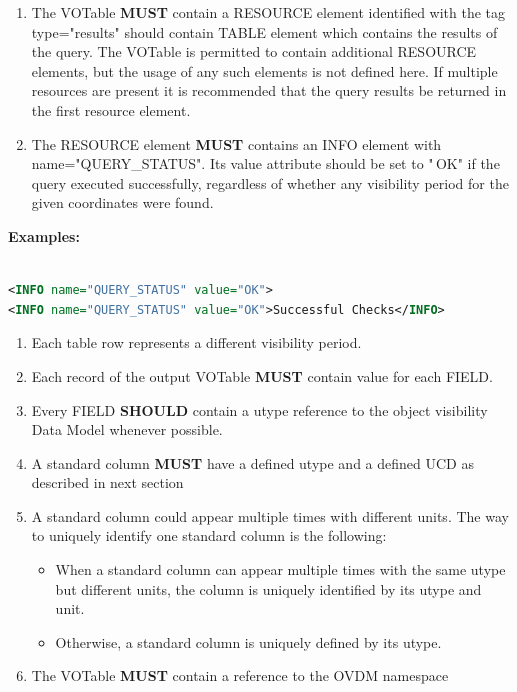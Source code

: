 \documentclass[11pt,a4paper]{ivoatex/ivoa}
\begin{document}
\begin{enumerate}
\item The VOTable \textbf{MUST} contain a RESOURCE element identified
with the tag type="results" should contain TABLE element which contains
the results of the query. The VOTable is permitted to contain additional
RESOURCE elements, but the usage of any such elements is not defined
here. If multiple resources are present it is recommended that the query
results be returned in the first resource element.
\item The RESOURCE element \textbf{MUST} contains an INFO element with
name="QUERY\_STATUS". Its value attribute should be set to "\,OK" if the
query executed successfully, regardless of whether any visibility period
for the given coordinates were found.
\setcounter{numberedCntBI}{\theenumi}
\end{enumerate}

\textbf{Examples: }
\begin{lstlisting}[language=XML]

<INFO name="QUERY_STATUS" value="OK">
<INFO name="QUERY_STATUS" value="OK">Successful Checks</INFO>
\end{lstlisting}

\begin{enumerate}
\setcounter{enumi}{\thenumberedCntBI}
\item Each table row represents a different visibility period.
\item Each record of the output VOTable \textbf{MUST} contain value
for each FIELD.
\item Every FIELD \textbf{SHOULD} contain a utype reference to the
object visibility Data Model whenever possible.
\item A standard column \textbf{MUST} have a defined utype and a
defined UCD as described in next section
\item A standard column could appear multiple times with different
units. The way to uniquely identify one standard column is the
following:
\begin{itemize}
\item When a standard column can appear multiple times with the same
utype but different units, the column is uniquely identified by its
utype and unit.
\item Otherwise, a standard column is uniquely defined by its utype.
\end{itemize}
\item The VOTable \textbf{MUST} contain a reference to the OVDM
namespace
\setcounter{numberedCntBI}{\theenumi}
\end{enumerate}
\end{document}
